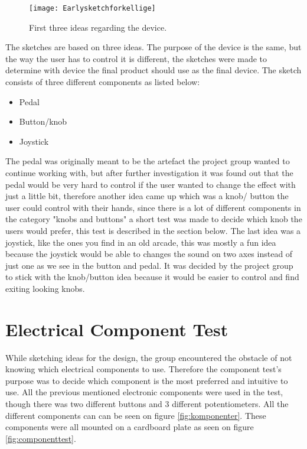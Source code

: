 \begin{figure}[!h] 
\centering
\texttt{[image: Earlysketchforkellige]}
\caption{\label{fig:Earlysketchforkellige}  First three ideas regarding the device.}
\end{figure}

The sketches are based on three ideas. The purpose of the device is the same, but the way the user has to control it is different, the sketches were made to determine with device the final product should use as the final device. The sketch consists of three different components as listed below: 

\begin{itemize}
\item Pedal
\item Button/knob 
\item Joystick 
\end{itemize}

The pedal was originally meant to be the artefact the project group wanted to continue working with, but after further investigation it was found out that the pedal would be very hard to control if the user wanted to change the effect with just a little bit, therefore another idea came up which was a knob/ button the user could control with their hands, since there is a lot of different components in the category "knobs and buttons" a short test was made to decide which knob the users would prefer, this test is described in the section below. 
The last idea was a joystick, like the ones you find in an old arcade, this was mostly a fun idea because the joystick would be able to changes the sound on two axes instead of just one as we see in the button and pedal. It was decided by the project group to stick with the knob/button idea because it would be easier to control and find exiting looking knobs. 

\section{Electrical Component Test}
While sketching ideas for the design, the group encountered the obstacle of not knowing which electrical components to use. Therefore the component test's purpose was to decide which component is the most preferred and intuitive to use. All the previous mentioned electronic components were used in the test, though there was two different buttons and 3 different potentiometers. All the different components can can be seen on figure \ref{fig:komponenter}. These components were all mounted on a cardboard plate as seen on figure \ref{fig:componenttest}.

